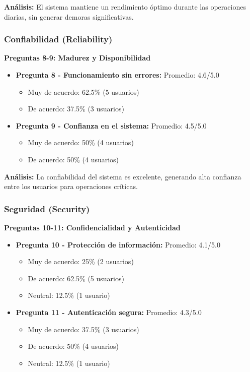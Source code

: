 \documentclass[conference]{IEEEtran}
\begin{document}
\textbf{Análisis:} El sistema mantiene un rendimiento óptimo durante las operaciones diarias, sin generar demoras significativas.

\subsubsection{Confiabilidad (Reliability)}
\textbf{Preguntas 8-9: Madurez y Disponibilidad}

\begin{itemize}
    \item \textbf{Pregunta 8 - Funcionamiento sin errores:} Promedio: 4.6/5.0
        \begin{itemize}
            \item Muy de acuerdo: 62.5\% (5 usuarios)
            \item De acuerdo: 37.5\% (3 usuarios)
        \end{itemize}
    \item \textbf{Pregunta 9 - Confianza en el sistema:} Promedio: 4.5/5.0
        \begin{itemize}
            \item Muy de acuerdo: 50\% (4 usuarios)
            \item De acuerdo: 50\% (4 usuarios)
        \end{itemize}
\end{itemize}

\textbf{Análisis:} La confiabilidad del sistema es excelente, generando alta confianza entre los usuarios para operaciones críticas.

\subsubsection{Seguridad (Security)}
\textbf{Preguntas 10-11: Confidencialidad y Autenticidad}

\begin{itemize}
    \item \textbf{Pregunta 10 - Protección de información:} Promedio: 4.1/5.0
        \begin{itemize}
            \item Muy de acuerdo: 25\% (2 usuarios)
            \item De acuerdo: 62.5\% (5 usuarios)
            \item Neutral: 12.5\% (1 usuario)
        \end{itemize}
    \item \textbf{Pregunta 11 - Autenticación segura:} Promedio: 4.3/5.0
        \begin{itemize}
            \item Muy de acuerdo: 37.5\% (3 usuarios)
            \item De acuerdo: 50\% (4 usuarios)
            \item Neutral: 12.5\% (1 usuario)
        \end{itemize}
\end{itemize}
\end{document}
